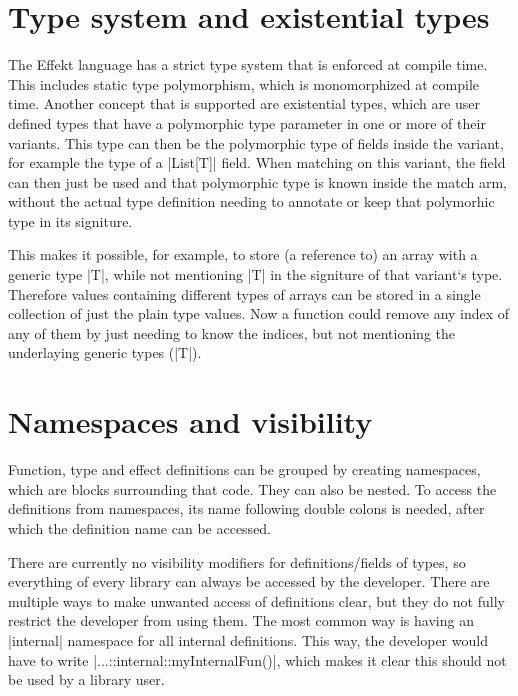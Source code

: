 \section{Type system and existential types}

The Effekt language has a strict type system that is enforced at compile time. This includes static type polymorphism, which is monomorphized at compile time. Another concept that is supported are existential types, which are user defined types that have a polymorphic type parameter in one or more of their variants. This type can then be the polymorphic type of fields inside the variant, for example the type of a |List[T]| field. When matching on this variant, the field can then just be used and that polymorphic type is known inside the match arm, without the actual type definition needing to annotate or keep that polymorhic type in its signiture.

This makes it possible, for example, to store (a reference to) an array with a generic type |T|, while not mentioning |T| in the signiture of that variant`s type. Therefore values containing different types of arrays can be stored in a single collection of just the plain type values. Now a function could remove any index of any of them by just needing to know the indices, but not mentioning the underlaying generic types (|T|).

\section{Namespaces and visibility}

Function, type and effect definitions can be grouped by creating namespaces, which are blocks surrounding that code. They can also be nested. To access the definitions from namespaces, its name following double colons is needed, after which the definition name can be accessed.

There are currently no visibility modifiers for definitions/fields of types, so everything of every library can always be accessed by the developer. There are multiple ways to make unwanted access of definitions clear, but they do not fully restrict the developer from using them. The most common way is having an |internal| namespace for all internal definitions. This way, the developer would have to write |...::internal::myInternalFun()|, which makes it clear this should not be used by a library user.
